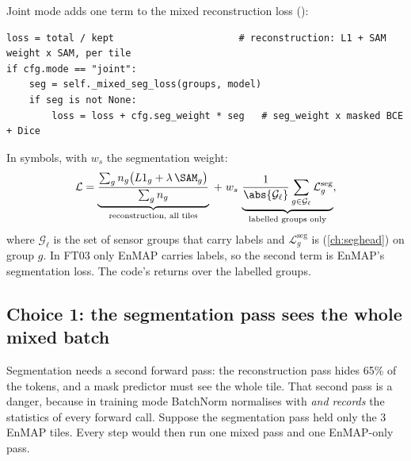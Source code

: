 Joint mode adds one term to the mixed reconstruction loss ():
\begin{lstlisting}
loss = total / kept                      # reconstruction: L1 + SAM weight x SAM, per tile
if cfg.mode == "joint":
    seg = self._mixed_seg_loss(groups, model)
    if seg is not None:
        loss = loss + cfg.seg_weight * seg   # seg_weight x masked BCE + Dice
\end{lstlisting}
In symbols, with $w_s$ the segmentation weight:
\begin{equation}\label{eq:finetune:joint}
  \mathcal{L} = \underbrace{\frac{\sum_g n_g\bigl(L1_g + \lambda\,\SAM_g\bigr)}{\sum_g n_g}}_{\text{reconstruction, all tiles}}
              \;+\; w_s\,\underbrace{\frac{1}{\abs{\mathcal{G}_\ell}}\sum_{g \in \mathcal{G}_\ell}\mathcal{L}^{\text{seg}}_g}_{\text{labelled groups only}},
\end{equation}
where $\mathcal{G}_\ell$ is the set of sensor groups that carry labels and $\mathcal{L}^{\text{seg}}_g$ is  (\cref{ch:seghead}) on group
$g$. In FT03 only EnMAP carries labels, so the second term is EnMAP's segmentation loss. The code's  returns
 over the labelled groups.

\subsection{Choice 1: the segmentation pass sees the whole mixed batch}

Segmentation needs a second forward pass: the reconstruction pass hides 65\% of the tokens, and a mask predictor must see the whole tile. That second pass
is a danger, because in training mode BatchNorm normalises with \emph{and records} the statistics of every forward call. Suppose the segmentation pass held
only the 3 EnMAP tiles. Every step would then run one mixed pass and one EnMAP-only pass.

